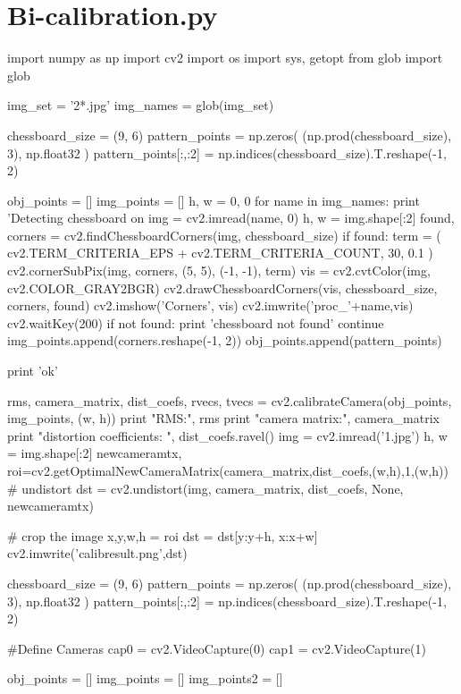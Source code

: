 \documentclass{article}
\begin{document}
\section{Bi-calibration.py} \label{App:AppendixB}
\begin{python}
import numpy as np
import cv2
import os
import sys, getopt
from glob import glob

img_set = '2*.jpg'
img_names = glob(img_set)

chessboard_size = (9, 6)
pattern_points = np.zeros( (np.prod(chessboard_size), 3), np.float32 )
pattern_points[:,:2] = np.indices(chessboard_size).T.reshape(-1, 2)

obj_points = []
img_points = []
h, w = 0, 0
for name in img_names:
    print 'Detecting chessboard on %
    img = cv2.imread(name, 0)
    h, w = img.shape[:2]
    found, corners = cv2.findChessboardCorners(img, chessboard_size)
    if found:
        term = ( cv2.TERM_CRITERIA_EPS + cv2.TERM_CRITERIA_COUNT, 30, 0.1 )
        cv2.cornerSubPix(img, corners, (5, 5), (-1, -1), term)
        vis = cv2.cvtColor(img, cv2.COLOR_GRAY2BGR)
        cv2.drawChessboardCorners(vis, chessboard_size, corners, found)
        cv2.imshow('Corners', vis)
        cv2.imwrite('proc_'+name,vis)
        cv2.waitKey(200)
    if not found:
        print 'chessboard not found'
        continue
    img_points.append(corners.reshape(-1, 2))
    obj_points.append(pattern_points)

    print 'ok'

rms, camera_matrix, dist_coefs, rvecs, tvecs = cv2.calibrateCamera(obj_points, img_points, (w, h))
print "RMS:", rms
print "camera matrix:\n", camera_matrix
print "distortion coefficients: ", dist_coefs.ravel()
img = cv2.imread('1.jpg')
h,  w = img.shape[:2]
newcameramtx, roi=cv2.getOptimalNewCameraMatrix(camera_matrix,dist_coefs,(w,h),1,(w,h))
# undistort
dst = cv2.undistort(img, camera_matrix, dist_coefs, None, newcameramtx)

# crop the image
x,y,w,h = roi
dst = dst[y:y+h, x:x+w]
cv2.imwrite('calibresult.png',dst)

chessboard_size = (9, 6)
pattern_points = np.zeros( (np.prod(chessboard_size), 3), np.float32 )
pattern_points[:,:2] = np.indices(chessboard_size).T.reshape(-1, 2)

#Define Cameras
cap0 = cv2.VideoCapture(0)
cap1 = cv2.VideoCapture(1)

obj_points = []
img_points = []
img_points2 = []


\end{python}
\end{document}
